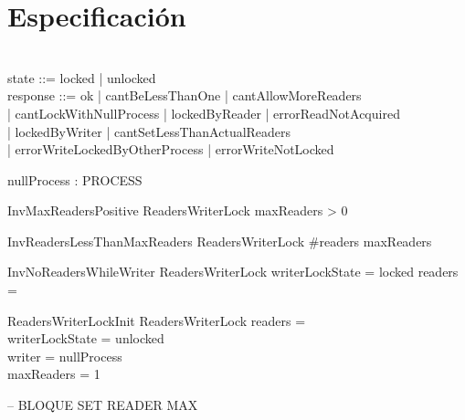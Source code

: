 \documentclass{article}
\begin{document}
\section{Especificación}
\begin{zed}
[PROCESS] \\
\also
state ::= locked | unlocked\\
\also
response ::= ok | cantBeLessThanOne | cantAllowMoreReaders \\
| cantLockWithNullProcess | lockedByReader | errorReadNotAcquired \\
| lockedByWriter | cantSetLessThanActualReaders \\
| errorWriteLockedByOtherProcess | errorWriteNotLocked
\end{zed}

\begin{axdef}
nullProcess : PROCESS
\end{axdef}



\begin{schema}{InvMaxReadersPositive}
    ReadersWriterLock
\where
    maxReaders > 0
\end{schema}

\begin{schema}{InvReadersLessThanMaxReaders}
    ReadersWriterLock
\where
    \#readers \leq maxReaders
\end{schema}

\begin{schema}{InvNoReadersWhileWriter}
    ReadersWriterLock
\where
    writerLockState = locked \implies readers = \emptyset
\end{schema}

\begin{schema}{ReadersWriterLockInit}
    ReadersWriterLock
\where
    readers = \emptyset \\
    writerLockState = unlocked \\
    writer = nullProcess \\
    maxReaders = 1
\end{schema}
\newpage

-- BLOQUE SET READER MAX
\end{document}
